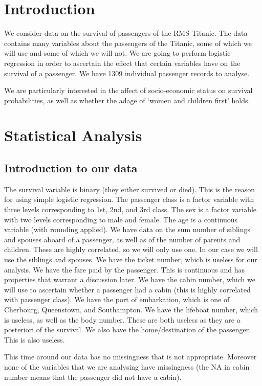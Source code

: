 \documentclass[9pt]{extarticle}
\begin{document}
\section{Introduction}

We consider data on the survival of passengers of the RMS Titanic. The data contains many variables about the passengers of the Titanic, some of which we will use and some of which we will not. We are going to perform logistic regression in order to ascertain the effect that certain variables have on the survival of a passenger. We have 1309 individual passenger records to analyse. 

We are particularly interested in the affect of socio-economic status on survival probabilities, as well as whether the adage of `women and children first' holds.

\section{Statistical Analysis}

\subsection{Introduction to our data}

The survival variable is binary (they either survived or died). This is the reason for using simple logistic regression. The passenger class is a factor variable with three levels corresponding to 1st, 2nd, and 3rd class. The sex is a factor variable with two levels corresponding to male and female. The age is a continuous variable (with rounding applied). We have data on the sum number of siblings and spouses aboard of a passenger, as well as of the number of parents and children. These are highly correlated, so we will only use one. In our case we will use the siblings and spouses. We have the ticket number, which is useless for our analysis. We have the fare paid by the passenger. This is continuous and has properties that warrant a discussion later. We have the cabin number, which we will use to ascertain whether a passenger had a cabin (this is highly correlated with passenger class). We have the port of embarkation, which is one of Cherbourg, Queenstown, and Southampton. We have the lifeboat number, which is useless, as well as the body number. These are both useless as they are a posteriori of the survival. We also have the home/destination of the passenger. This is also useless.

This time around our data has no missingness that is not appropriate. Moreover none of the variables that we are analysing have missingness (the NA in cabin number means that the passenger did not have a cabin). 
\end{document}
